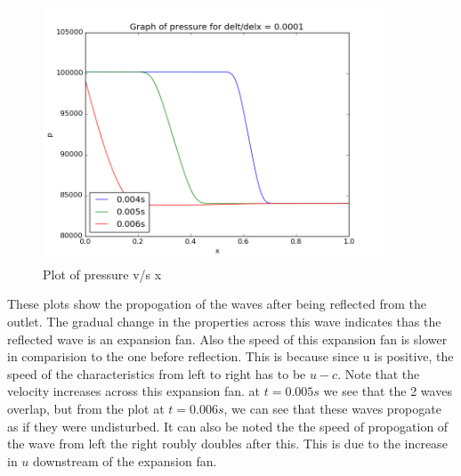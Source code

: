 \documentclass[11pt, a4paper]{article}
\begin{document}
\begin{figure}[H]
 \centering
 \includegraphics[width = 0.9\textwidth]{FTCS2_1_8.png}
 \caption{Plot of pressure v/s x}
\end{figure}

These plots show the propogation of the waves after being reflected from the outlet. The gradual change in the properties 
across this wave indicates thas the reflected wave is an expansion fan. Also the speed of this expansion fan is slower in 
comparision to the one before reflection. This is because since u is positive, the speed of the characteristics from left to 
right has to be $u-c$. Note that the velocity increases across this expansion fan. at $t = 0.005s$ we see that the 2 waves 
overlap, but from the plot at $t=0.006s$, we can see that these waves propogate as if they were undisturbed. It can also be 
noted the the speed of propogation of the wave from left the right roubly doubles after this. This is due to the increase in 
$u$ downstream of the expansion fan.
\end{document}
